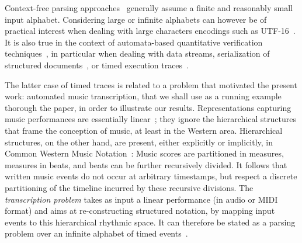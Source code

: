 
Context-free parsing approaches~\cite{GruneJacobs08parsing}
generally assume a finite and reasonably small input alphabet. %
Considering large or infinite alphabets can however be of
practical interest when dealing with large characters encodings such as UTF-16~\cite{dAntoni21CACM}.
It is also true in the context of automata-based quantitative verification techniques~\cite{Kwiatkowska07quantitativeVerif},  %
in particular when dealing with data streams, 
serialization of structured documents~\cite{Segoufin06csl,NevenSchwentickVianu04FSMinfinite},
or timed execution traces~\cite{Bouyer03algebraic}.


The latter case of timed traces 
is related to a problem that motivated the present work:
automated music transcription, 
that we shall use as a running example
thorough the paper, in order to illustrate our results.
%
Representations capturing music performances
are essentially linear~\cite{Selfridge-Field97beyondMIDI};
they ignore the hierarchical structures that frame the
conception of music, at least in the Western area. 
Hierarchical structures, on the other hand, are present, either explicitly  or implicitly,
in Common Western Music Notation~\cite{Gould11Notation}:
Music scores are partitioned in measures,
measures in beats, and beats can be further recursively divided.
It follows that written music events do not occur at arbitrary timestamps,
but respect a discrete partitioning of the timeline incurred by
these recursive divisions.
The \emph{transcription problem} takes
as input a linear performance (in audio or MIDI format) 
and aims at re-constructing structured notation, 
by mapping input events to this hierarchical rhythmic space.
It can therefore be stated as a parsing problem
over an infinite alphabet of timed events~\cite{foscarin:hal-01988990}.

